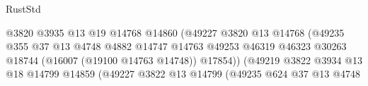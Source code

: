 \begin{lexlean}{RustStd}
\begin{coremodule}
                                                      @3820
                                                      @3935
                                                      @13
                                                      @19
                                                      @14768
                                                      @14860
                                                      (@49227
                                                        @3820
                                                        @13
                                                        @14768
                                                        (@49235
                                                          @355
                                                          @37
                                                          @13
                                                          @4748
                                                          @4882
                                                          @14747
                                                          @14763
                                                          @49253
                                                          @46319
                                                          @46323
                                                          @30263
                                                          @18744
                                                          (@16007 (@19100 @14763 @14748))
                                                          @17854))
                                                      (@49219
                                                        @3822
                                                        @3934
                                                        @13
                                                        @18
                                                        @14799
                                                        @14859
                                                        (@49227
                                                          @3822
                                                          @13
                                                          @14799
                                                          (@49235
                                                            @624
                                                            @37
                                                            @13
                                                            @4748

\end{coremodule}
\end{lexlean}
